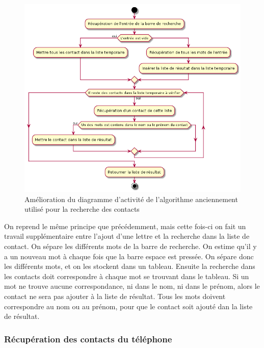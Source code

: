 \begin{figure}[!h]
	\centering
	\includegraphics[scale=0.6]{img/activity_retrieve_better.png}
	\caption{\label{activity_retrieve_better} {Amélioration du diagramme d'activité de l'algorithme anciennement utilisé pour la recherche des contacts}}
\end{figure}

On reprend le même principe que précédemment, mais cette fois-ci on fait un travail supplémentaire entre l'ajout d'une lettre et la recherche dans la liste de contact. On sépare les différents mots de la barre de recherche. On estime qu'il y a un nouveau mot à chaque fois que la barre espace est pressée. On sépare donc les différents mots, et on les stockent dans un tableau. Ensuite la recherche dans les contacts doit correspondre à chaque mot se trouvant dans le tableau. Si un mot ne trouve aucune correspondance, ni dans le nom, ni dans le prénom, alors le contact ne sera pas ajouter à la liste de résultat. Tous les mots doivent correspondre au nom ou au prénom, pour que le contact soit ajouté dan la liste de résultat.

\newpage

\subsubsection{Récupération des contacts du téléphone}

